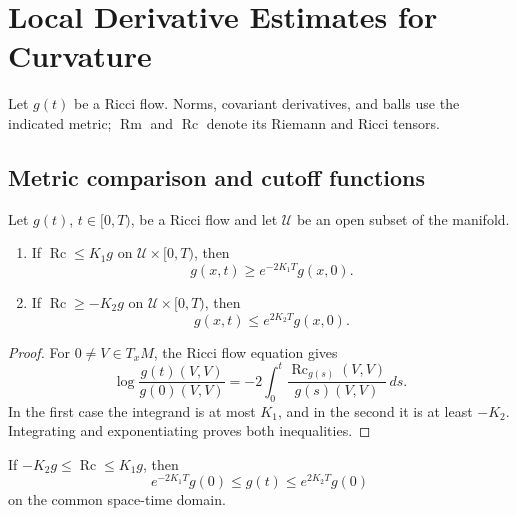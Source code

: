 \chapter[14]{Local Derivative Estimates for Curvature}
\label{ch:chow-ii-local-derivative-estimates}

Let \(g(t)\) be a Ricci flow.  Norms, covariant derivatives, and balls use
the indicated metric; \(\operatorname{Rm}\) and \(\operatorname{Rc}\) denote
its Riemann and Ricci tensors.

\section{Metric comparison and cutoff functions}

\begin{lemma}
\label{lem:chow-ii-ricci-bounds-metric-comparison}
Let \(g(t)\), \(t\in[0,T)\), be a Ricci flow and let \(\mathcal U\) be an
open subset of the manifold.
\begin{enumerate}
\item If \(\operatorname{Rc}\le K_1g\) on \(\mathcal U\times[0,T)\), then
\[
g(x,t)\ge e^{-2K_1T}g(x,0).
\]
\item If \(\operatorname{Rc}\ge-K_2g\) on \(\mathcal U\times[0,T)\), then
\[
g(x,t)\le e^{2K_2T}g(x,0).
\]
\end{enumerate}
\end{lemma}
\begin{proof}
\sketch For \(0\ne V\in T_xM\), the Ricci flow equation gives
\[
\log\frac{g(t)(V,V)}{g(0)(V,V)}
=-2\int_0^t\frac{\operatorname{Rc}_{g(s)}(V,V)}{g(s)(V,V)}\,ds.
\]
In the first case the integrand is at most \(K_1\), and in the second it is
at least \(-K_2\).  Integrating and exponentiating proves both inequalities.
\end{proof}

\begin{remark}
\label{rem:chow-ii-uniform-metric-equivalence}
If \(-K_2g\le\operatorname{Rc}\le K_1g\), then
\[
e^{-2K_1T}g(0)\le g(t)\le e^{2K_2T}g(0)
\]
on the common space-time domain.
\end{remark}

